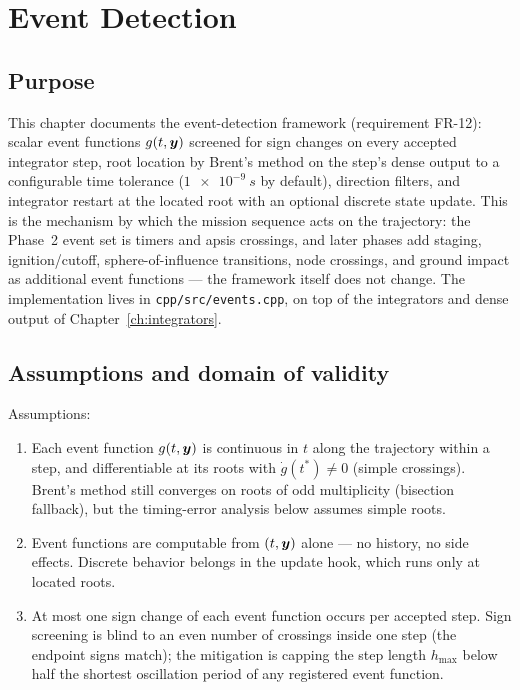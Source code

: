 \chapter{Event Detection}
\label{ch:events}

\section{Purpose}
\label{sec:events:purpose}

This chapter documents the event-detection framework (requirement FR-12):
scalar event functions $g(t, \bm{y})$ screened for sign changes on every
accepted integrator step, root location by Brent's method on the step's
dense output to a configurable time tolerance ($\qty{1e-9}{s}$ by default),
direction filters, and integrator restart at the located root with an
optional discrete state update. This is the mechanism by which the mission
sequence acts on the trajectory: the Phase~2 event set is timers and apsis
crossings, and later phases add staging, ignition/cutoff, sphere-of-influence
transitions, node crossings, and ground impact as additional event functions
--- the framework itself does not change. The implementation lives in
\texttt{cpp/src/events.cpp}, on top of the integrators and dense output of
Chapter~\ref{ch:integrators}.

\section{Assumptions and domain of validity}
\label{sec:events:domain}

Assumptions:
\begin{enumerate}
  \item Each event function $g(t, \bm{y})$ is continuous in $t$ along the
    trajectory within a step, and differentiable at its roots with
    $\dot{g}(t^{*}) \neq 0$ (simple crossings). Brent's method still
    converges on roots of odd multiplicity (bisection fallback), but the
    timing-error analysis below assumes simple roots.
  \item Event functions are computable from $(t, \bm{y})$ alone --- no
    history, no side effects. Discrete behavior belongs in the update hook,
    which runs only at located roots.
  \item At most one sign change of each event function occurs per accepted
    step. Sign screening is blind to an even number of crossings inside one
    step (the endpoint signs match); the mitigation is capping the step
    length $h_{\max}$ below half the shortest oscillation period of any
    registered event function.
\end{enumerate}

